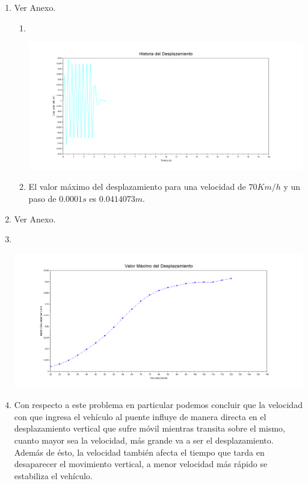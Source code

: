 \documentclass[10pt]{article}
\begin{document}
\begin{enumerate}

\item Ver Anexo.

\begin{enumerate}
  \item \text{} \\
  \centerline{\includegraphics[width=21cm]{graf1}}
  \item  El valor máximo del desplazamiento para una velocidad de $70Km/h$ y un paso de $0.0001s$ es $0.0414073m$.
 \end{enumerate}
 
 \item Ver Anexo.
 
 \item \text{} \\
  \centerline{\includegraphics[width=21cm]{graf2}}
  
 \item Con respecto a este problema en particular podemos concluir que la velocidad con que ingresa el vehículo al puente influye de
 manera directa en el desplazamiento vertical que sufre móvil mientras transita sobre el mismo, cuanto mayor sea la velocidad, más grande
 va a ser el desplazamiento. Además de ésto, la velocidad también afecta el tiempo que tarda en desaparecer el movimiento vertical, a menor
 velocidad más rápido se estabiliza el vehículo.
 

\end{enumerate}
\end{document}
